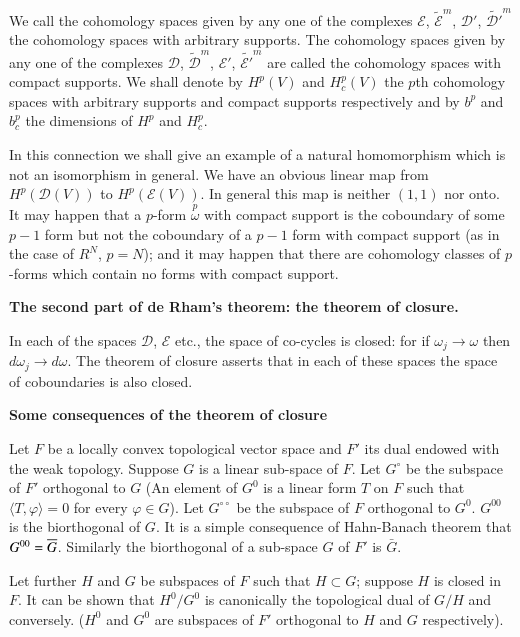 We call the cohomology spaces given by any one of the complexes
$\mathscr{E}$, $\widetilde{\mathscr{E}}^{m}$, $\mathscr{D}'$,
$\widetilde{\mathscr{D}'}^{m}$ the cohomology spaces with arbitrary
supports. The cohomology spaces given by any one of the complexes
$\mathscr{D}$, $\widetilde{\mathscr{D}}^{m}$, $\mathscr{E}'$,
$\widetilde{\mathscr{E}'}^{m}$ are called the cohomology spaces with
compact supports. We shall denote by $H^{p}(V)$ and $H^{p}_{c}(V)$ the
$p$th cohomology spaces with arbitrary supports and compact supports
respectively and by $b^{p}$ and $b^{p}_{c}$ the dimensions of $H^{p}$
and $H^{p}_{c}$.

In this connection we shall give an example of a natural homomorphism
which is not an isomorphism in general. We have an obvious linear map
from $H^{p}(\mathscr{D}(V))$ to $H^{p}(\mathscr{E}(V))$. In general
this map is neither $(1,1)$ nor onto. It may happen that a $p$-form
$\overset{p}{\omega}$ with compact support is the coboundary of some
$p-1$ form but not the coboundary of a $p-1$ form with compact support
(as in the case of $R^{N}$, $p=N$); and it may happen that there are
cohomology classes of $p$-forms which contain no forms with compact
support.

\medskip
\noindent
{\bf The second part of de Rham's theorem: the theorem of closure.}
\smallskip

In each of the spaces $\mathscr{D}$, $\mathscr{E}$ etc., the space of
co-cycles is closed: for if $\omega_{j}\to \omega$ then
$d\omega_{j}\to d\omega$. The theorem of closure asserts that in each
of these spaces the space of coboundaries is also closed.

\medskip
\noindent
{\bf Some consequences of the theorem of closure}\pageoriginale
\smallskip

Let $F$ be a locally convex topological vector space and $F'$ its dual
endowed with the weak topology. Suppose $G$ is a linear sub-space of
$F$. Let $G^{\circ}$ be the subspace of $F'$ orthogonal to $G$ (An element
of $G^{0}$ is a linear form $T$ on $F$ such that $\langle
T,\varphi\rangle=0$ for every $\varphi\in G$). Let $G^{\circ\circ}$ be the
subspace of $F$ orthogonal to $G^{0}$. $G^{00}$ is the biorthogonal of
$G$. It is a simple consequence of Hahn-Banach theorem that
$G^{00}=\overline{G}$. Similarly the biorthogonal of a sub-space $G$ of $F'$
is $\bar{G}$.

Let further $H$ and $G$ be subspaces of $F$ such that $H\subset G$;
suppose $H$ is closed in $F$. It can be shown that $H^{0}/G^{0}$ is
canonically the topological dual of $G/H$ and conversely. ($H^{0}$ and
$G^{0}$ are subspaces of $F'$ orthogonal to $H$ and $G$ respectively).

